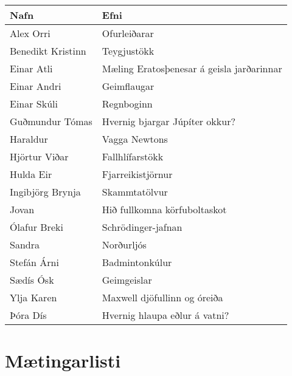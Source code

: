 \begin{table}[H]
    \centering
    \begin{tabular}{|l|l|}
    \hline  \textbf{Nafn} & \textbf{Efni} \\ \hline \hline
       Alex Orri  & Ofurleiðarar  \\ \hline
       Benedikt Kristinn & Teygjustökk \\ \hline
       Einar Atli & Mæling Eratosþenesar á geisla jarðarinnar  \\ \hline
       Einar Andri & Geimflaugar  \\ \hline
       Einar Skúli & Regnboginn \\ \hline
       Guðmundur Tómas & Hvernig bjargar Júpíter okkur?  \\ \hline
       Haraldur & Vagga Newtons \\ \hline
       Hjörtur Viðar & Fallhlífarstökk   \\ \hline
       Hulda Eir & Fjarreikistjörnur  \\ \hline
       Ingibjörg Brynja & Skammtatölvur \\ \hline
       Jovan & Hið fullkomna körfuboltaskot  \\ \hline
       Ólafur Breki & Schrödinger-jafnan \\ \hline
       Sandra & Norðurljós \\ \hline
       Stefán Árni & Badmintonkúlur \\ \hline
       Sædís Ósk & Geimgeislar \\ \hline
       Ylja Karen & Maxwell djöfullinn og óreiða  \\ \hline
       Þóra Dís & Hvernig hlaupa eðlur á vatni?  \\ \hline
    \end{tabular}
\end{table}


\newpage


\section*{Mætingarlisti}

